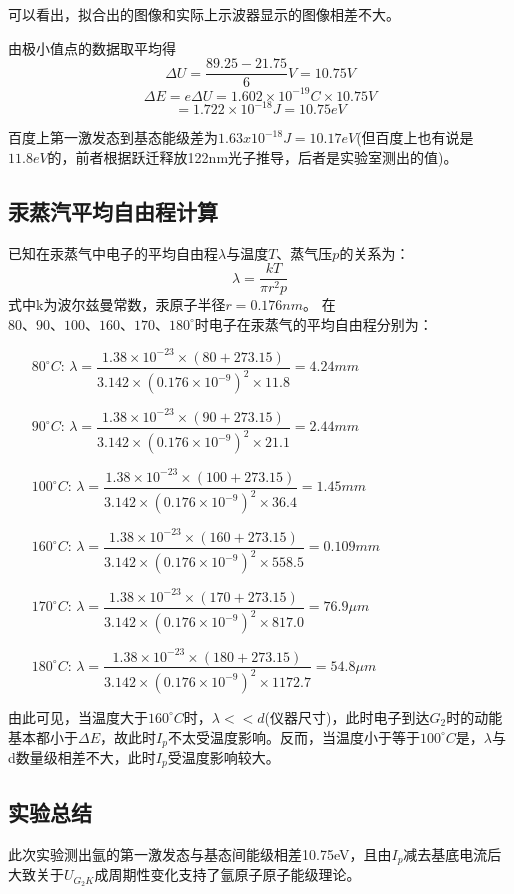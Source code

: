 \documentclass[UEF8]{ctexart}
\begin{document}
\begin{multicols}{2}
可以看出，拟合出的图像和实际上示波器显示的图像相差不大。

由极小值点的数据取平均得$$\Delta{U}=\dfrac{89.25-21.75}{6}V=10.75V$$
$$\Delta{E}=e\Delta{U}={1.602}\times{10^{-19}}C\times{10.75V}$$
$$=1.722\times10^{-18}J=10.75eV$$

百度上第一激发态到基态能级差为$1.63x10^{-18}J=10.17eV$(但百度上也有说是$11.8eV$的，前者根据跃迁释放122nm光子推导，后者是实验室测出的值)。

\subsection{汞蒸汽平均自由程计算}
已知在汞蒸气中电子的平均自由程$\lambda$与温度$T$、蒸气压$p$的关系为：
$$\lambda=\dfrac{kT}{\pi{r^2}p}$$
式中k为波尔兹曼常数，汞原子半径$r=0.176nm$。
在$80、90、100、160、170、180^\circ$时电子在汞蒸气的平均自由程分别为：
\begin{enumerate}
	\item[$80^\circ{C}$:] $\lambda=\dfrac{1.38\times10^{-23}\times(80+273.15)}{3.142\times(0.176\times10^{-9})^2\times{11.8}}=4.24mm$
	\item[$90^\circ{C}$:] $\lambda=\dfrac{1.38\times10^{-23}\times(90+273.15)}{3.142\times(0.176\times10^{-9})^2\times{21.1}}=2.44mm$
	\item[$100^\circ{C}$:] $\lambda=\dfrac{1.38\times10^{-23}\times(100+273.15)}{3.142\times(0.176\times10^{-9})^2\times{36.4}}=1.45mm$
	\item[$160^\circ{C}$:] $\lambda=\dfrac{1.38\times10^{-23}\times(160+273.15)}{3.142\times(0.176\times10^{-9})^2\times{558.5}}=0.109mm$
	\item[$170^\circ{C}$:] $\lambda=\dfrac{1.38\times10^{-23}\times(170+273.15)}{3.142\times(0.176\times10^{-9})^2\times{817.0}}=76.9\mu{m}$
	\item[$180^\circ{C}$:] $\lambda=\dfrac{1.38\times10^{-23}\times(180+273.15)}{3.142\times(0.176\times10^{-9})^2\times{1172.7}}=54.8\mu{m}$
\end{enumerate}

由此可见，当温度大于$160^\circ{C}$时，$\lambda<<d$(仪器尺寸)，此时电子到达$G_{2}$时的动能基本都小于$\Delta{E}$，故此时$I_{p}$不太受温度影响。反而，当温度小于等于$100^\circ{C}$是，$\lambda$与d数量级相差不大，此时$I_{p}$受温度影响较大。

\subsection{实验总结}
此次实验测出氩的第一激发态与基态间能级相差10.75eV，且由$I_{p}$减去基底电流后大致关于$U_{G_{2}K}$成周期性变化支持了氩原子原子能级理论。


\end{multicols}
\end{document}
